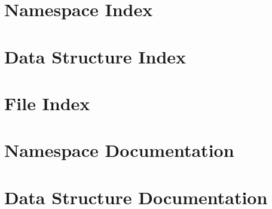 \let\mypdfximage\pdfximage\def\pdfximage{\immediate\mypdfximage}\documentclass[twoside]{book}
\newcommand{\+}{\discretionary{\mbox{\scriptsize$\hookleftarrow$}}{}{}}
\begin{document}
\chapter{Namespace Index}

\chapter{Data Structure Index}

\chapter{File Index}

\chapter{Namespace Documentation}



\chapter{Data Structure Documentation}










\end{document}
